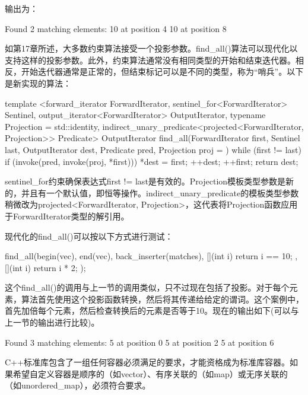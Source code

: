 输出为：

\begin{shell}
Found 2 matching elements:
10 at position 4
10 at position 8
\end{shell}


如第17章所述，大多数约束算法接受一个投影参数。find\_all()算法可以现代化以支持这样的投影参数。此外，约束算法通常没有相同类型的开始和结束迭代器。相反，开始迭代器通常是正常的，但结束标记可以是不同的类型，称为“哨兵”。以下是新实现的算法：

\begin{cpp}
template <forward_iterator ForwardIterator,
    sentinel_for<ForwardIterator> Sentinel,
    output_iterator<ForwardIterator> OutputIterator,
    typename Projection = std::identity,
    indirect_unary_predicate<projected<ForwardIterator, Projection>> Predicate>
OutputIterator find_all(ForwardIterator first, Sentinel last,
                        OutputIterator dest, Predicate pred, Projection proj = {})
{
    while (first != last) {
        if (invoke(pred, invoke(proj, *first))) {
            *dest = first;
            ++dest;
        }
        ++first;
    }
    return dest;
}
\end{cpp}

sentinel\_for约束确保表达式first != last是有效的。Projection模板类型参数是新的，并且有一个默认值，即恒等操作。indirect\_unary\_predicate的模板类型参数稍微改为projected<ForwardIterator, Projection>，这代表将Projection函数应用于ForwardIterator类型的解引用。

现代化的find\_all()可以按以下方式进行测试：

\begin{cpp}
find_all(begin(vec), end(vec), back_inserter(matches),
    [](int i) { return i == 10; },
    [](int i) { return i * 2; });
\end{cpp}

这个find\_all()的调用与上一节的调用类似，只不过现在包括了投影。对于每个元素，算法首先使用这个投影函数转换，然后将其传递给给定的谓词。这个案例中，首先加倍每个元素，然后检查转换后的元素是否等于10。现在的输出如下(可以与上一节的输出进行比较)。

\begin{shell}
Found 3 matching elements:
5 at position 0
5 at position 2
5 at position 6
\end{shell}


C++标准库包含了一组任何容器必须满足的要求，才能资格成为标准库容器。如果希望自定义容器是顺序的（如vector）、有序关联的（如map）或无序关联的（如unordered\_map），必须符合要求。

